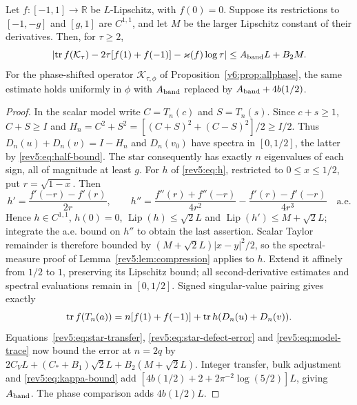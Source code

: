 \begin{theorem}
\label{v7:thm:band-regularity}
Let $f:[-1,1]\to\mathbb R$ be $L$-Lipschitz, with $f(0)=0$.
Suppose its restrictions to $[-1,-g]$ and $[g,1]$ are $C^{1,1}$,
and let $M$ be the larger Lipschitz constant of their derivatives.
Then, for $\tau\ge2$,
\[
 \left|\operatorname{tr} f(\mathcal K_\tau)
       -2\tau[f(1)+f(-1)]-\varkappa(f)\log\tau\right|
 \le A_{\rm band}L+B_2M.
\]
For the phase-shifted operator $\mathcal K_{\tau,\phi}$ of
Proposition~\ref{v6:prop:allphase}, the same estimate holds uniformly in $\phi$
with $A_{\rm band}$ replaced by $A_{\rm band}+4b(1/2)$.
\end{theorem}
\begin{proof}
In the scalar model write $C=T_n(c)$ and $S=T_n(s)$.
Since $c+s\ge1$, $C+S\ge I$ and
$H_n=C^2+S^2=[(C+S)^2+(C-S)^2]/2\ge I/2$.
Thus $D_n(u)+D_n(v)=I-H_n$ and $D_n(v_0)$ have spectra in $[0,1/2]$,
the latter by \eqref{rev5:eq:half-bound}. The star consequently has
exactly $n$ eigenvalues of each sign, all of magnitude at least $g$.
For $h$ of \eqref{rev5:eq:h}, restricted to $0\le x\le1/2$, put
$r=\sqrt{1-x}$. Then
\[
 h'=\frac{f'(-r)-f'(r)}{2r},\qquad
 h''=\frac{f''(r)+f''(-r)}{4r^2}
       -\frac{f'(r)-f'(-r)}{4r^3}\quad\text{a.e.}
\]
Hence $h\in C^{1,1}$, $h(0)=0$,
$\operatorname{Lip}(h)\le\sqrt2L$ and
$\operatorname{Lip}(h')\le M+\sqrt2L$; integrate the a.e. bound on $h''$
to obtain the last assertion. Scalar Taylor remainder is therefore
bounded by $(M+\sqrt2L)|x-y|^2/2$, so the spectral-measure proof of
Lemma~\ref{rev5:lem:compression} applies to $h$.
Extend it affinely from $1/2$ to $1$, preserving its Lipschitz bound;
all second-derivative estimates and spectral evaluations remain in
$[0,1/2]$. Signed singular-value pairing gives exactly
\[
 \operatorname{tr} f(T_n(a))=n[f(1)+f(-1)]+\operatorname{tr} h(D_n(u)+D_n(v)).
\]
Equations~\eqref{rev5:eq:star-transfer},
\eqref{rev5:eq:star-defect-error} and \eqref{rev5:eq:model-trace}
now bound the error at $n=2q$ by
$2C_VL+(C_*+B_1)\sqrt2L+B_2(M+\sqrt2L)$.
Integer transfer, bulk adjustment and \eqref{rev5:eq:kappa-bound} add
$[4b(1/2)+2+2\pi^{-2}\log(5/2)]L$, giving $A_{\rm band}$.
The phase comparison adds $4b(1/2)L$.
\end{proof}


